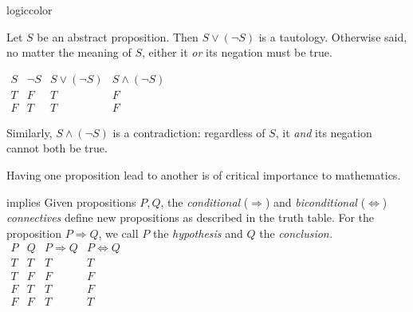 \begin{examples}{}{logiccolor}
\begin{enumerate}
	
		\begin{minipage}[t]{0.64\linewidth}\vspace{0pt}
  		\item Let $S$ be an abstract proposition. Then $S\vee (\neg S)$ is a tautology. Otherwise said, no matter the meaning of $S$, either it \emph{or} its negation must be true.
  	\end{minipage}
  	\hfill
  	\begin{minipage}[t]{0.33\linewidth}\vspace{0pt}
			$\begin{array}{cc||c|c}
				S & \neg S & S\vee (\neg S) & S\wedge(\neg S)\\\hline
				T & F & T & F\\
				F & T & T & F
			\end{array}$
  	\end{minipage}\par
  	Similarly, $S\wedge(\neg S)$ is a contradiction: regardless of $S$, it \emph{and} its negation cannot both be true.
	\end{enumerate}
\end{examples}



Having one proposition lead to another is of critical importance to mathematics.

\begin{defn}[lower separated=false, sidebyside, sidebyside align=top seam, sidebyside gap=0pt, righthand width=0.37\linewidth]{}{implies}
	Given propositions $P,Q$, the \emph{conditional} ($\Rightarrow$) and \emph{biconditional} ($\Leftrightarrow$) \emph{connectives} define new propositions as described in the truth table.\smallbreak
	For the proposition $P\Longrightarrow Q$, we call $P$ the \emph{hypothesis} and $Q$ the \emph{conclusion.}
	\tcblower
	\flushright%
	$\begin{array}{cc||c|c}
		P & Q & P\Longrightarrow Q & P\Longleftrightarrow Q\\\hline
		T & T & T & T\\
		T & F & F & F\\
		F & T & T & F\\
		F & F & T & T
	\end{array}$
\end{defn}


